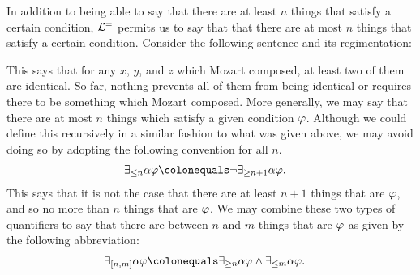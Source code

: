In addition to being able to say that there are at least $n$ things that satisfy a certain condition, $\mathcal{L}^{=}$ permits us to say that that there are at most $n$ things that satisfy a certain condition. 
Consider the following sentence and its regimentation:
\begin{earg} \label{mozart2most}
\end{earg}
This says that for any $x$, $y$, and $z$ which Mozart composed, at least two of them are identical. 
So far, nothing prevents all of them from being identical or requires there to be something which Mozart composed. 
%
%
More generally, we may say that there are at most $n$ things which satisfy a given condition $\varphi$.
Although we could define this recursively in a similar fashion to what was given above, we may avoid doing so by adopting the following convention for all $n$.
\begin{align*}
  \qt{\exists_{\leq n}}{\alpha}\metaA &\colonequals \enot\qt{\exists_{\geq n+1}}{\alpha}\metaA.
\end{align*}
This says that it is not the case that there are at least $n+1$ things that are $\varphi$, and so no more than $n$ things that are $\varphi$. 
We may combine these two types of quantifiers to say that there are between $n$ and $m$ things that are $\varphi$ as given by the following abbreviation: 
\begin{align*}
  \qt{\exists_{[n,m]}}{\alpha}\metaA &\colonequals \qt{\exists_{\geq n}}{\alpha}\metaA \eand \qt{\exists_{\leq m}}{\alpha}\metaA.
\end{align*}
